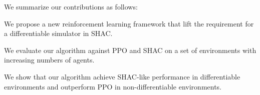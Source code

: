 We summarize our contributions as follows:
\begin{compactitem}
    \item We propose a new reinforcement learning framework that lift the requirement for a differentiable simulator in SHAC.
    \item We evaluate our algorithm against PPO and SHAC on a set of environments with increasing numbers of agents.
    \item We show that our algorithm achieve SHAC-like performance in differentiable environments and outperform PPO in non-differentiable environments.
\end{compactitem}
